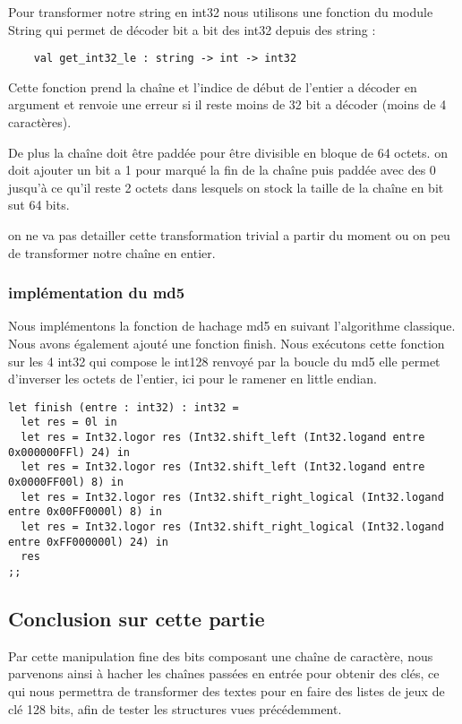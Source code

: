 \documentclass[12pt,a4paper]{article}
\begin{document}
    Pour transformer notre string en int32 nous utilisons une fonction du module String qui permet de décoder bit a bit des int32 depuis des string :
    
\bigskip 
\begin{lstlisting}
    val get_int32_le : string -> int -> int32
\end{lstlisting} \bigskip  

    Cette fonction prend la chaîne et l'indice de début de l'entier a décoder en argument et renvoie une erreur si il reste moins de 32 bit a décoder (moins de 4 caractères).

    De plus la chaîne doit être paddée pour être divisible en bloque de 64 octets. 
    on doit ajouter un bit a 1 pour marqué la fin de la chaîne puis paddée avec des 0 jusqu'à ce qu'il reste 2 octets dans lesquels on stock la taille de la chaîne en bit sut 64 bits. 

    
    on ne va pas detailler cette transformation trivial a partir du moment ou on peu de transformer notre chaîne en entier.


    \subsubsection{implémentation du md5}
    
    Nous implémentons la fonction de hachage md5 en suivant l'algorithme classique. Nous avons également ajouté une fonction finish. Nous exécutons cette fonction sur les 4 int32 qui compose le int128 renvoyé par la boucle du md5 elle permet d'inverser les octets de l'entier, ici pour le ramener en little endian.
    
\bigskip \begin{lstlisting}
let finish (entre : int32) : int32 =
  let res = 0l in
  let res = Int32.logor res (Int32.shift_left (Int32.logand entre 0x000000FFl) 24) in 
  let res = Int32.logor res (Int32.shift_left (Int32.logand entre 0x0000FF00l) 8) in 
  let res = Int32.logor res (Int32.shift_right_logical (Int32.logand entre 0x00FF0000l) 8) in 
  let res = Int32.logor res (Int32.shift_right_logical (Int32.logand entre 0xFF000000l) 24) in 
  res
;;
\end{lstlisting} \bigskip 

    
\subsection{Conclusion sur cette partie}

Par cette manipulation fine des bits composant une chaîne de caractère, nous parvenons ainsi à hacher les chaînes passées en entrée pour obtenir des clés, ce qui nous permettra de transformer des textes pour en faire des listes de jeux de clé 128 bits, afin de tester les structures vues précédemment.
\end{document}
